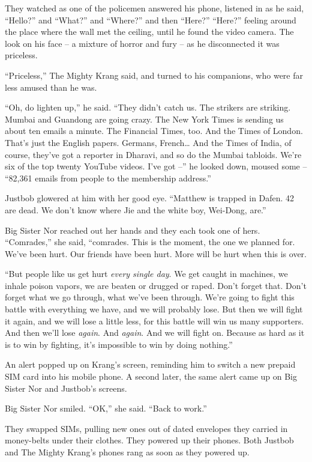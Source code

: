 They watched as one of the policemen answered his phone, listened
in as he said, ``Hello?'' and ``What?'' and ``Where?'' and then ``Here?''
``Here?'' feeling around the place where the wall met the ceiling,
until he found the video camera. The look on his face -- a mixture
of horror and fury -- as he disconnected it was priceless.

``Priceless,'' The Mighty Krang said, and turned to his companions,
who were far less amused than he was.

``Oh, do lighten up,'' he said. ``They didn't catch us. The strikers
are striking. Mumbai and Guandong are going crazy. The New York
Times is sending us about ten emails a minute. The Financial Times,
too. And the Times of London. That's just the English papers.
Germans, French\ldots{} And the Times of India, of course, they've got a
reporter in Dharavi, and so do the Mumbai tabloids. We're six of
the top twenty YouTube videos. I've got --'' he looked down, moused
some -- ``82,361 emails from people to the membership address.''

Justbob glowered at him with her good eye. ``Matthew is trapped in
Dafen. 42 are dead. We don't know where Jie and the white boy,
Wei-Dong, are.''

Big Sister Nor reached out her hands and they each took one of
hers. ``Comrades,'' she said, ``comrades. This is the moment, the one
we planned for. We've been hurt. Our friends have been hurt. More
will be hurt when this is over.

``But people like us get hurt \emph{every single day}. We get caught
in machines, we inhale poison vapors, we are beaten or drugged or
raped. Don't forget that. Don't forget what we go through, what
we've been through. We're going to fight this battle with
everything we have, and we will probably lose. But then we will
fight it again, and we will lose a little less, for this battle
will win us many supporters. And then we'll lose \emph{again}. And
\emph{again}. And we will fight on. Because as hard as it is to win
by fighting, it's impossible to win by doing nothing.''

An alert popped up on Krang's screen, reminding him to switch a new
prepaid SIM card into his mobile phone. A second later, the same
alert came up on Big Sister Nor and Justbob's screens.

Big Sister Nor smiled. ``OK,'' she said. ``Back to work.''

They swapped SIMs, pulling new ones out of dated envelopes they
carried in money-belts under their clothes. They powered up their
phones. Both Justbob and The Mighty Krang's phones rang as soon as
they powered up.

